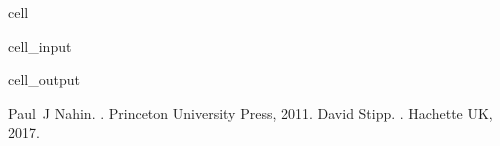 \documentclass[letterpaper,10pt,english]{jupyterBook}
\begin{document}
\begin{sphinxuseclass}{cell}\begin{sphinxVerbatimInput}

\begin{sphinxuseclass}{cell_input}
\begin{sphinxVerbatim}[commandchars=\\\{\}]
  
 \PYG{p}{[}\PYG{p}{]} 


\end{sphinxVerbatim}

\end{sphinxuseclass}\end{sphinxVerbatimInput}
\begin{sphinxVerbatimOutput}

\begin{sphinxuseclass}{cell_output}
\noindent{}

\end{sphinxuseclass}\end{sphinxVerbatimOutput}

\end{sphinxuseclass}
\begin{sphinxthebibliography}{1}
\sphinxAtStartPar
Paul J Nahin. . Princeton University Press, 2011.
\sphinxAtStartPar
David Stipp. . Hachette UK, 2017.
\end{sphinxthebibliography}







\renewcommand{\indexname}{Index}
\printindex
\end{document}
